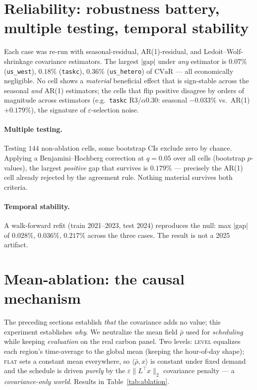 \documentclass[11pt]{article}
\newcommand{\CVaR}{\mathrm{CVaR}}
\begin{document}
\section{Reliability: robustness battery, multiple testing, temporal stability}\label{sec:robust}

Each case was re-run with seasonal-residual, AR(1)-residual, and Ledoit--Wolf-shrinkage
covariance estimators. The largest $|\text{gap}|$ under \emph{any} estimator is
$0.07\%$ (\texttt{us\_west}), $0.18\%$ (\texttt{taskc}), $0.36\%$ (\texttt{us\_hetero})
of $\CVaR$ --- all economically negligible. No cell shows a \emph{material} beneficial
effect that is sign-stable across the seasonal \emph{and} AR(1) estimators; the cells
that flip positive disagree by orders of magnitude across estimators (e.g.\ \texttt{taskc}
R3/$\alpha 0.30$: seasonal $-0.033\%$ vs.\ AR(1) $+0.179\%$), the signature of
$\varepsilon$-selection noise.

\paragraph{Multiple testing.} Testing $144$ non-ablation cells, some bootstrap CIs
exclude zero by chance. Applying a Benjamini--Hochberg correction at $q=0.05$ over all
cells (bootstrap $p$-values), the largest \emph{positive} gap that survives is
$0.179\%$ --- precisely the AR(1) cell already rejected by the agreement rule. Nothing
material survives both criteria.

\paragraph{Temporal stability.} A walk-forward refit (train 2021--2023, test 2024)
reproduces the null: max $|\text{gap}|$ of $0.028\%$, $0.036\%$, $0.217\%$ across the
three cases. The result is not a 2025 artifact.

\section{Mean-ablation: the causal mechanism}\label{sec:ablation}

The preceding sections establish \emph{that} the covariance adds no value; this
experiment establishes \emph{why}. We neutralize the mean field $\bar\rho$ used for
\emph{scheduling} while keeping \emph{evaluation} on the real carbon panel. Two levels:
\textsc{level} equalizes each region's time-average to the global mean (keeping the
hour-of-day shape); \textsc{flat} sets a constant mean everywhere, so $\langle
\bar\rho, x\rangle$ is constant under fixed demand and the schedule is driven
\emph{purely} by the $\varepsilon\lVert L^{\!\top} x\rVert_2$ covariance penalty --- a
\emph{covariance-only world}. Results in Table~\ref{tab:ablation}.
\end{document}
